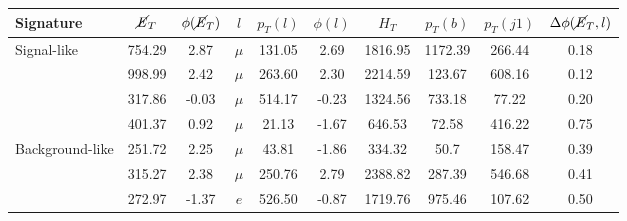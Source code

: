 \begin{table}[htbp]
    \centering
    \begin{tabular}{p{2.2cm}||c|c|c|c|c|c|c|c|c}
        \toprule
        \textbf{Signature} & $\cancel{\it{E}}_{T}$ & $\phi(\cancel{\it{E}}_{T})$ & $l$ & $p_T(l)$ & $\phi(l)$ & $H_T$ & $p_T(b)$ & $p_T(j1)$ & $\Delta \phi(\cancel{\it{E}}_{T},l)$ \\
        \midrule
        \multirow{3.75}{*}{Signal-like} & \cellcolor{gray!6}754.29 & \cellcolor{gray!6}2.87 & \cellcolor{gray!6}$\mu$ & \cellcolor{gray!6}131.05 & \cellcolor{gray!6}2.69 & \cellcolor{gray!6}1816.95 & \cellcolor{gray!6}1172.39 & \cellcolor{gray!6}266.44 & \cellcolor{gray!6}0.18 \\
        & 998.99 & 2.42 & $\mu$ & 263.60 & 2.30 & 2214.59 & 123.67 & 608.16 & 0.12 \\
        &\cellcolor{gray!6}317.86 & \cellcolor{gray!6}-0.03 & \cellcolor{gray!6}$\mu$ & \cellcolor{gray!6}514.17 & \cellcolor{gray!6}-0.23 & \cellcolor{gray!6}1324.56 & \cellcolor{gray!6}733.18 & \cellcolor{gray!6}77.22 & \cellcolor{gray!6}0.20	\\
        & 401.37 & 0.92 & $\mu$ & 21.13 & -1.67 & 646.53 & 72.58 & 416.22 & 0.75 \\
        \midrule
        \multirow{3.75}{*}{\parbox{2.2cm}{Background-like}}&\cellcolor{gray!6}251.72  & \cellcolor{gray!6}2.25 & \cellcolor{gray!6}$\mu$ & \cellcolor{gray!6}43.81 & \cellcolor{gray!6}-1.86 & \cellcolor{gray!6}334.32 & \cellcolor{gray!6}50.7 & \cellcolor{gray!6}158.47 & \cellcolor{gray!6}0.39 \\
        & 315.27 & 2.38 & $\mu$ & 250.76 & 2.79 & 2388.82 & 287.39 & 546.68 & 0.41 \\
        &\cellcolor{gray!6}272.97 & \cellcolor{gray!6}-1.37 & \cellcolor{gray!6}$e$ & \cellcolor{gray!6}526.50 & \cellcolor{gray!6}-0.87 & \cellcolor{gray!6}1719.76 & \cellcolor{gray!6}975.46 & \cellcolor{gray!6}107.62 & \cellcolor{gray!6} 0.50 \\

\end{tabular}
\end{table}
